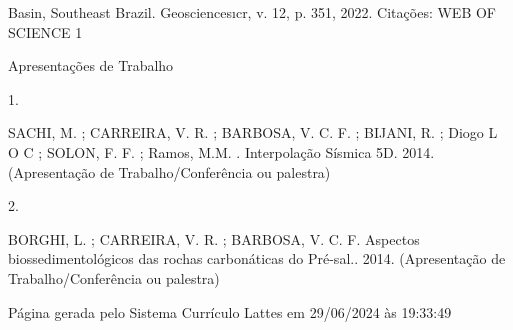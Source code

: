\documentclass[10pt]{article}
\begin{document}
Basin, Southeast Brazil. Geosciencesıcr, v. 12, p. 351, 2022. Citações: WEB OF SCIENCE 1

Apresentações de Trabalho

1.

SACHI, M. ; CARREIRA, V. R. ; BARBOSA, V. C. F. ; BIJANI, R. ; Diogo L O C ; SOLON, F. F. ; Ramos, M.M. . Interpolação Sísmica 5D. 2014. (Apresentação de Trabalho/Conferência ou palestra)

2.

BORGHI, L. ; CARREIRA, V. R. ; BARBOSA, V. C. F. Aspectos biossedimentológicos das rochas carbonáticas do Pré-sal.. 2014. (Apresentação de Trabalho/Conferência ou palestra)

Página gerada pelo Sistema Currículo Lattes em 29/06/2024 às 19:33:49
\end{document}
